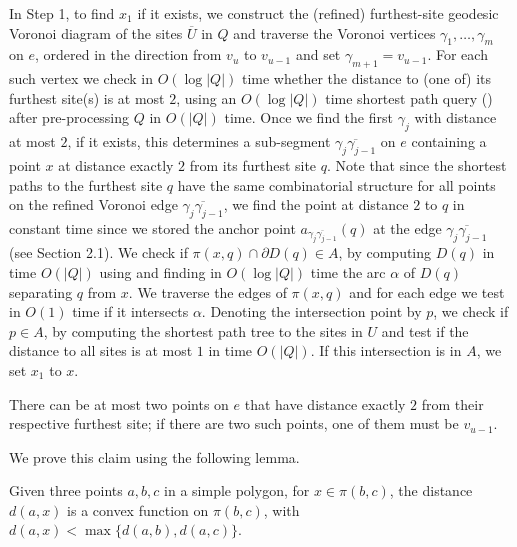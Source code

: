 \documentclass{llncs}
\begin{document}
In Step 1, to find $x_1$ if it exists, we construct the (refined) furthest-site geodesic Voronoi diagram of the sites $\overline{U}$ in $Q$ and traverse the Voronoi vertices $\gamma_1, \ldots, \gamma_m$ on $e$, ordered in the direction from $v_{u}$  to $v_{u-1}$ and set $\gamma_{m+1} =  v_{u-1}$. For each such vertex we check in $O(\log |Q|)$ time whether the distance to (one of) its furthest site(s) is at most $2$, using an $O(\log |Q|)$ time shortest path query (\cite{Guibas1989126}) after pre-processing $Q$ in $O(|Q|)$ time. Once we find the first $\gamma_j$ with distance at most $2$, if it exists, this determines a sub-segment $\overline{\gamma_j\gamma_{j-1}}$ on $e$ containing a point $x$ at distance exactly $2$ from its furthest site $q$. Note that since the shortest paths to the furthest site $q$ have the same combinatorial structure for all points on the refined Voronoi edge $\overline{\gamma_j\gamma_{j-1}}$, we find the point at distance $2$ to $q$ in constant time since we stored the anchor point $a_{\overline{\gamma_j\gamma_{j-1}}}(q)$ at the edge $\overline{\gamma_j\gamma_{j-1}}$ (see Section 2.1). We check if $\pi(x,q) \cap \partial D(q) \in A$, by computing $D(q)$ in time $O(|Q|)$ using \cite{lineshortpath} and finding in $O(\log|Q|)$ time the arc $\alpha$ of $D(q)$ separating $q$ from $x$. We traverse the edges of $\pi(x,q)$ and for each edge we test in $O(1)$ time if it intersects $\alpha$. Denoting the intersection point by $p$, we check if $p \in A$, by computing the shortest path tree to the sites in $U$ and test if the distance to all sites is at most $1$ in time $O(|Q|)$. If this intersection is in $A$, we set $x_1$ to $x$.\\

\vspace{-9pt}
\begin{claim}There can be at most two points on $e$ that have distance exactly $2$ from their respective furthest site; if there are two such points, one of them must be $v_{u-1}$.  
\label{claim}
\end{claim}
\vspace{-3pt}

We prove this claim using the following lemma.
\begin{lemma}
Given three points $a,b,c$ in a simple polygon, for $x \in \pi(b,c)$, the distance $d(a,x)$ is a convex function on $\pi(b,c)$, with  $d(a,x) < \max\{d(a,b), d(a,c)\}$.
\label{pollackCon}
\end{lemma}
\end{document}
